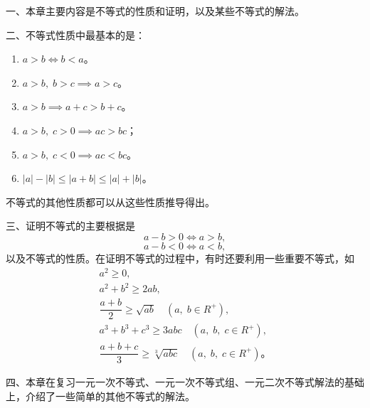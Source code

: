 \xiaojie

一、本章主要内容是不等式的性质和证明，以及某些不等式的解法。

 二、不等式性质中最基本的是：

\begin{enumerate}[itemindent=1em, nosep]
    \item $a > b \iff b < a$。
    \item $a > b, \; b > c \implies a > c$。
    \item $a > b \implies a + c > b + c$。
    \item $a > b, \; c > 0 \implies ac > bc$；
    \item[] $a > b, \; c < 0 \implies ac < bc$。
    \item $|a| - |b| \leqslant |a + b| \leqslant |a| + |b|$。
\end{enumerate}

不等式的其他性质都可以从这些性质推导得出。

三、证明不等式的主要根据是
$$ a - b > 0 \iff a > b, $$
$$ a - b < 0 \iff a < b, $$
以及不等式的性质。在证明不等式的过程中，有时还要利用一些重要不等式，如
\begin{gather*}
    a^2 \geqslant 0, \\
    a^2 + b^2 \geqslant 2ab, \\
    \dfrac{a + b}{2} \geqslant \sqrt{ab} \quad (a,\; b \in R^+), \\
    a^3 + b^3 + c^3 \geqslant 3abc  \quad (a,\; b,\; c \in R^+), \\
    \dfrac{a + b + c}{3} \geqslant \sqrt[3]{abc}  \quad (a,\; b,\; c \in R^+) \text{。}
\end{gather*}


四、本章在复习一元一次不等式、一元一次不等式组、一元二次不等式解法的基础上，介绍了一些简单的其他不等式的解法。
